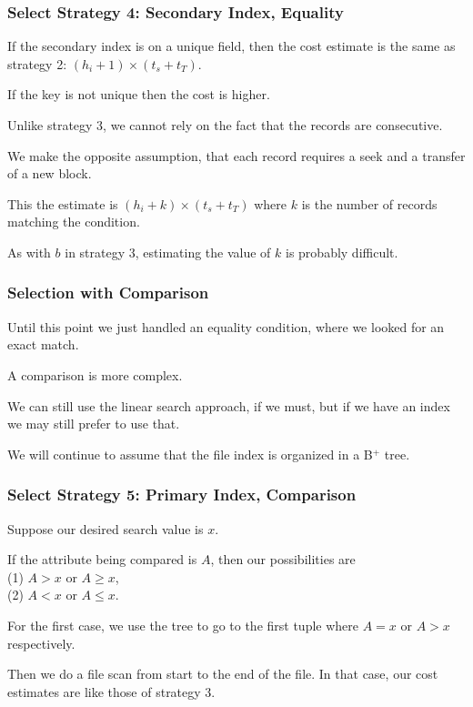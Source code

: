 \begin{frame}
\frametitle{Select Strategy 4: Secondary Index, Equality}
If the secondary index is on a unique field, then the cost estimate is the same as strategy 2:  $(h_{i} + 1) \times (t_{s} + t_{T})$.

If the key is not unique then the cost is higher. 

Unlike strategy 3, we cannot rely on the fact that the records are consecutive.

We make the opposite assumption, that each record requires a seek and a transfer of a new block. 

This the estimate is $(h_{i} + k) \times (t_{s} + t_{T})$ where $k$ is the number of records matching the condition.

As with $b$ in strategy 3, estimating the value of $k$ is probably difficult.


\end{frame}



\begin{frame}
\frametitle{Selection with Comparison}

Until this point we just handled an equality condition, where we looked for an exact match. 

A comparison is more complex. 

We can still use the linear search approach, if we must, but if we have an index we may still prefer to use that. 

We will continue to assume that the file index is organized in a B$^{+}$ tree.

\end{frame}

\begin{frame}
\frametitle{Select Strategy 5: Primary Index, Comparison}

Suppose our desired search value is $x$. 

If the attribute being compared is $A$, then our possibilities are\\
\quad (1) $A > x$ or $A \geq x$,\\
\quad (2) $A < x$ or $A \leq x$.

For the first case, we use the tree to go to the first tuple where $A = x$ or $A > x$ respectively. 

Then we do a file scan from start to the end of the file. In that case, our cost estimates are like those of strategy 3.
\end{frame}

